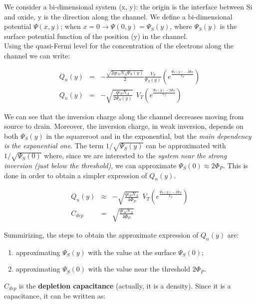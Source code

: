 \documentclass[a4paper, 12pt, twoside, openright]{report}
\begin{document}
We consider a bi-dimensional system (x, y): the origin is the interface between Si and oxide, y is the direction along the channel. We define a bi-dimensional potential $\Psi(x,y)$; when $x = 0 \rightarrow \Psi(0, y) = \Psi_S(y)$, where $\Psi_S(y)$ is the surface potential  function of the position (y) in the channel.\\
Using the quasi-Fermi level for the concentration of the electrons along the channel we can write:

  \begin{eqnarray*}
      Q_n(y)&=&-\frac{\sqrt{2q \epsilon_S N_A \Psi_S(y)}}{2} \frac{V_T}{\Psi_S(y)}
             \left(e^{\displaystyle \frac{\Psi_S(y)-2\Phi_P}{V_T}}
              \right)\\[2ex]
      Q_n(y)&=&-\sqrt{\frac{q \epsilon_S N_A}{2\Psi_S(y)}}~~ V_T
             \left(e^{\displaystyle \frac{\Psi_S(y)-2\Phi_P}{V_T}}
              \right)
     \end{eqnarray*}

We can see that the inversion charge along the channel decreases moving from source to drain. Moreover, the inversion charge, in weak inversion, depends on both $\Psi_S(y)$ in the squareroot and in the exponential, but the \emph{main dependency is the exponential one}. The term $1/\sqrt{\Psi_S(y)}$ can be approximated with $1/\sqrt{\Psi_S(0)}$ where, since we are interested to the \emph{system near the strong inversion (just below the threshold)}, we can approximate $\Psi_S(0) \approx 2\Phi_P$.
This is done in order to obtain a simpler expression of $Q_{n}(y)$.

	\begin{eqnarray*}
	      Q_n(y)&\approx &-\sqrt{\frac{q \epsilon_S N_A}{4\Phi_P}}~~V_T
	             \left(e^{\displaystyle \frac{\Psi_S(y)-2\Phi_P}{V_T}}
	              \right)\\[2ex]
	       C_{dep}&=& {\sqrt{\frac{q \epsilon_S N_A}{ 4\Phi_P}}}
	\end{eqnarray*}

Summirizing, the steps to obtain the approximate expression of $Q_{n}(y)$ are:
\begin{enumerate}
\item approximating $\Psi_S(y)$ with the value at the surface $\Psi_S(0)$;
\item approximating $\Psi_S(0)$ with the value near the threshold $2\Phi_P$.
\end{enumerate}

$C_{dep}$ is the \textbf{depletion capacitance} (actually, it is a density). Since it is a capacitance, it can be written as:
\end{document}
